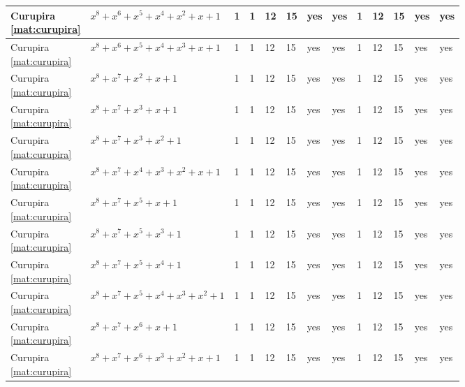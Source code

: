 \begin{tiny}
\begin{longtable}{|l|l|l|l|l|l|l|l|l|l|l|l|l|}
\shortstack{Curupira \\ \eqref{mat:curupira}} & $x^8 + x^6 + x^5 + x^4 + x^2 + x + 1$ & 1 & 1 & 12 & 15 & yes & yes & 1 & 12 & 15 & yes & yes \\ \hline
\shortstack{Curupira \\ \eqref{mat:curupira}} & $x^8 + x^6 + x^5 + x^4 + x^3 + x + 1$ & 1 & 1 & 12 & 15 & yes & yes & 1 & 12 & 15 & yes & yes \\ \hline
\shortstack{Curupira \\ \eqref{mat:curupira}} & $x^8 + x^7 + x^2 + x + 1$ & 1 & 1 & 12 & 15 & yes & yes & 1 & 12 & 15 & yes & yes \\ \hline
\shortstack{Curupira \\ \eqref{mat:curupira}} & $x^8 + x^7 + x^3 + x + 1$ & 1 & 1 & 12 & 15 & yes & yes & 1 & 12 & 15 & yes & yes \\ \hline
\shortstack{Curupira \\ \eqref{mat:curupira}} & $x^8 + x^7 + x^3 + x^2 + 1$ & 1 & 1 & 12 & 15 & yes & yes & 1 & 12 & 15 & yes & yes \\ \hline
\shortstack{Curupira \\ \eqref{mat:curupira}} & $x^8 + x^7 + x^4 + x^3 + x^2 + x + 1$ & 1 & 1 & 12 & 15 & yes & yes & 1 & 12 & 15 & yes & yes \\ \hline
\shortstack{Curupira \\ \eqref{mat:curupira}} & $x^8 + x^7 + x^5 + x + 1$ & 1 & 1 & 12 & 15 & yes & yes & 1 & 12 & 15 & yes & yes \\ \hline
\shortstack{Curupira \\ \eqref{mat:curupira}} & $x^8 + x^7 + x^5 + x^3 + 1$ & 1 & 1 & 12 & 15 & yes & yes & 1 & 12 & 15 & yes & yes \\ \hline
\shortstack{Curupira \\ \eqref{mat:curupira}} & $x^8 + x^7 + x^5 + x^4 + 1$ & 1 & 1 & 12 & 15 & yes & yes & 1 & 12 & 15 & yes & yes \\ \hline
\shortstack{Curupira \\ \eqref{mat:curupira}} & $x^8 + x^7 + x^5 + x^4 + x^3 + x^2 + 1$ & 1 & 1 & 12 & 15 & yes & yes & 1 & 12 & 15 & yes & yes \\ \hline
\shortstack{Curupira \\ \eqref{mat:curupira}} & $x^8 + x^7 + x^6 + x + 1$ & 1 & 1 & 12 & 15 & yes & yes & 1 & 12 & 15 & yes & yes \\ \hline
\shortstack{Curupira \\ \eqref{mat:curupira}} & $x^8 + x^7 + x^6 + x^3 + x^2 + x + 1$ & 1 & 1 & 12 & 15 & yes & yes & 1 & 12 & 15 & yes & yes \\ \hline

\end{longtable}
\end{tiny}
